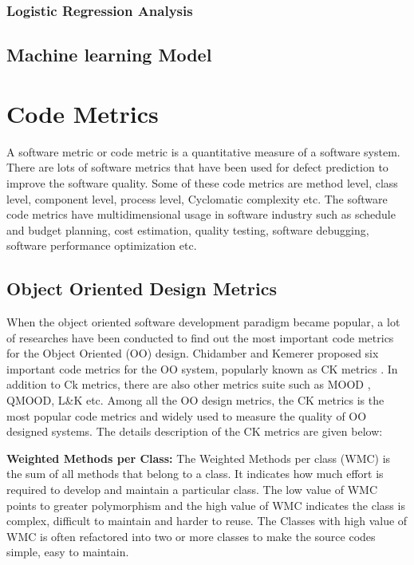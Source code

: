 \documentclass[12pt]{report}
\begin{document}
\subsubsection{Logistic Regression Analysis}

\subsection{Machine learning Model}
\section{Code Metrics}

A software metric or code metric is a quantitative measure of a software system. There are lots of software metrics that have been used for defect prediction to improve the software quality. Some of these code metrics are method level, class level, component level, process level, Cyclomatic complexity etc. The software code metrics have multidimensional usage in software industry such as schedule and budget planning, cost estimation, quality testing, software debugging, software performance optimization etc.


\subsection{Object Oriented Design Metrics}
\label{Code_Metrics_background_study}
When the object oriented software development paradigm became popular, a lot of researches have been conducted to find out the most important code metrics for the Object Oriented (OO) design. Chidamber and Kemerer proposed six important code metrics for the OO system, popularly known as CK metrics \cite{chidamber1994metrics}. In addition to Ck metrics, there are also other metrics suite such as MOOD \cite{bansiya2002hierarchical}, QMOOD, L\&K etc. Among all the OO design metrics, the CK metrics is the most popular code metrics and widely used to measure the quality of OO designed systems. The details description of the CK metrics are given below:

\textbf{Weighted Methods per Class:}
The Weighted Methods per class (WMC) is the sum of all methods that belong to a class. It indicates how much effort is required to develop and maintain a particular class. The low value of WMC points to greater polymorphism and the high value of WMC indicates the class is complex, difficult to maintain and harder to reuse. The Classes with high value of WMC is often refactored into two or more classes to make the source codes simple, easy to maintain.
\end{document}
